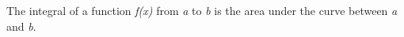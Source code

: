 \documentclass[preview]{standalone}
\begin{document}
\begin{center}
The integral of a function \textit{f(x)} from \textit{a} to \textit{b} is the area under the curve between \textit{a} and \textit{b}.
\end{center}
\end{document}
